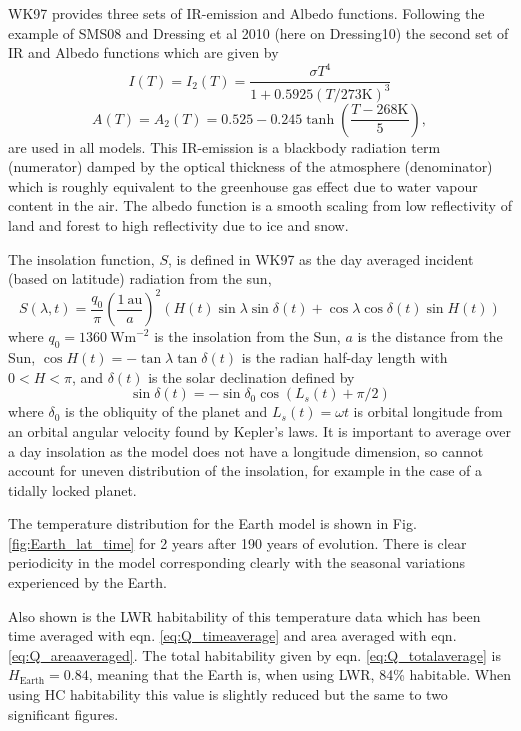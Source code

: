 \documentclass[12pt, onecolumn]{revtex4-2}    %
\begin{document}
WK97 provides three sets of IR-emission and Albedo functions. Following the example of SMS08 and Dressing et al 2010 (here on Dressing10) \cite{Dressing10} the second set of IR and Albedo functions which are given by
\begin{equation}
  I(T) = I_2(T) = \frac{\sigma T^4}{1 + 0.5925 (T / 273 \text{K}) ^ 3}
\end{equation}
\begin{equation}
  A(T) = A_2(T) = 0.525 - 0.245 \tanh\left(\frac{T - 268 \text{K}}{5}\right),
\end{equation}
are used in all models.
This IR-emission is a blackbody radiation term (numerator) damped by the optical thickness of the atmosphere (denominator) which is roughly equivalent to the greenhouse gas effect due to water vapour content in the air.
The albedo function is a smooth scaling from low reflectivity of land and forest to high reflectivity due to ice and snow.

The insolation function, $S$, is defined in WK97 as the day averaged incident (based on latitude) radiation from the sun,
$$
  S(\lambda, t) = \frac{q_0}{\pi} \left(\frac{1 \ \text{au}}{a}\right)^2 (H(t) \sin{\lambda} \sin{\delta(t)} + \cos{\lambda} \cos{\delta(t)} \sin{H(t)})
$$
where $q_0=1360 \ \text{Wm}^{-2}$ is the insolation from the Sun,
$a$ is the distance from the Sun,
$\cos H(t) = -\tan \lambda \tan \delta(t)$ is the radian half-day length with $0 < H < \pi$,
and $\delta(t)$ is the solar declination defined by
$$
  \sin \delta(t) = -\sin \delta_0 \cos(L_s(t) + \pi/2)
$$
where $\delta_0$ is the obliquity of the planet and $L_s(t) = \omega t$ is orbital longitude from an orbital angular velocity found by Kepler's laws.
It is important to average over a day insolation as the model does not have a longitude dimension, so cannot account for uneven distribution of the insolation, for example in the case of a tidally locked planet.

The temperature distribution for the Earth model is shown in Fig. \ref{fig:Earth_lat_time} for 2 years after 190 years of evolution.
There is clear periodicity in the model corresponding clearly with the seasonal variations experienced by the Earth.

Also shown is the LWR habitability of this temperature data which has been time averaged with eqn. \eqref{eq:Q_timeaverage} and area averaged with eqn. \eqref{eq:Q_areaaveraged}.
The total habitability given by eqn. \eqref{eq:Q_totalaverage} is $H_\text{Earth} = 0.84$, meaning that the Earth is, when using LWR, 84\% habitable.
When using HC habitability this value is slightly reduced but the same to two significant figures.
\end{document}
